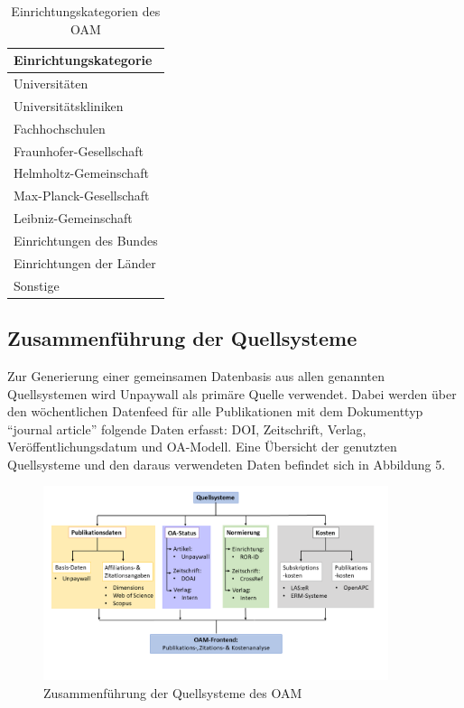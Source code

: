 \documentclass[a4paper,
fontsize=11pt,
oneside,
numbers=noperiodatend,
parskip=half-,
bibliography=totoc,
final
]{scrartcl}
\begin{document}
\begin{table}[!ht]
    \centering
    \begin{tabular}{l}
    \toprule
        \textbf{Einrichtungskategorie}  \\
        \midrule
Universitäten \\
Universitätskliniken \\
Fachhochschulen \\
Fraunhofer-Gesellschaft \\
Helmholtz-Gemeinschaft \\
Max-Planck-Gesellschaft \\
Leibniz-Gemeinschaft \\
Einrichtungen des Bundes \\
Einrichtungen der Länder \\
Sonstige \\
  \bottomrule
\end{tabular}
           \caption{Einrichtungskategorien des OAM}
\end{table}

\hypertarget{zusammenfuxfchrung-der-quellsysteme}{%
\subsection{Zusammenführung der
Quellsysteme}\label{zusammenfuxfchrung-der-quellsysteme}}

Zur Generierung einer gemeinsamen Datenbasis aus allen genannten
Quellsystemen wird Unpaywall als primäre Quelle verwendet. Dabei werden
über den wöchentlichen Datenfeed für alle Publikationen mit dem
Dokumenttyp \enquote{journal article} folgende Daten erfasst: DOI,
Zeitschrift, Verlag, Veröffentlichungsdatum und OA-Modell. Eine
Übersicht der genutzten Quellsysteme und den daraus verwendeten Daten
befindet sich in Abbildung 5.

\begin{figure}
\centering
\includegraphics[width=0.9\textwidth]{img/Abb_5_Quellsys_workflow.png}
\caption{Zusammenführung der Quellsysteme des OAM}
\end{figure}
\end{document}
